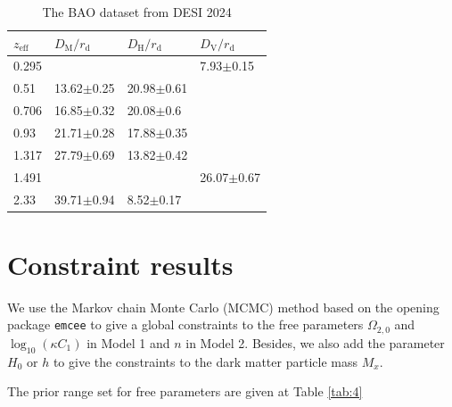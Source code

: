 \documentclass[twocolumn]{aastex631}
\begin{document}
   \begin{table}[htbp]
      \caption{The BAO dataset from DESI 2024}
      \centering
      \begin{tabular}{llll}
         \hline\hline
         $z_{\text{eff}}$ & $D_{\text{M}}/r_{\text{d}}$ & $D_{\text{H}}/r_{\text{d}}$ & $D_{\text{V}}/r_{\text{d}}$ \\
         \hline
         0.295 & & & 7.93$\pm$0.15 \\
         0.51 & 13.62$\pm$0.25 & 20.98$\pm$0.61 & \\
         0.706 & 16.85$\pm$0.32 & 20.08$\pm$0.6 & \\
         0.93 & 21.71$\pm$0.28 & 17.88$\pm$0.35 & \\
         1.317 & 27.79$\pm$0.69 & 13.82$\pm$0.42 & \\
         1.491 & & & 26.07$\pm$0.67 \\
         2.33 & 39.71$\pm$0.94 & 8.52$\pm$0.17 & \\
         \hline
      \end{tabular}
      \label{tab:3}
   \end{table}

\section{Constraint results}

   We use the Markov chain Monte Carlo (MCMC) method based 
   on the opening package \texttt{emcee} to give a global constraints
   to the free parameters $\Omega_{2,0}$ and $\log_{10}(\kappa C_1)$ in 
   Model 1 and $n$ in Model 2.
   Besides, we also add the parameter $H_0$ or $h$ to give the constraints
   to the dark matter particle mass $M_x$.

   The prior range set for free parameters are given at Table \ref{tab:4}
\end{document}

